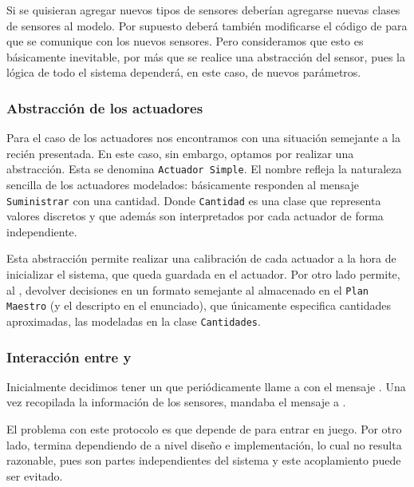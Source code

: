           Si se quisieran agregar nuevos tipos de sensores deber\'ian agregarse nuevas
          clases de sensores al modelo. Por supuesto deber\'a tambi\'en modificarse
          el c\'odigo de \condiciones{} para que se comunique
          con los nuevos sensores. Pero consideramos que esto es b\'asicamente inevitable,
          por m\'as que se realice una abstracci\'on del sensor, pues la l\'ogica
          de todo el sistema depender\'a, en este caso, de nuevos par\'ametros.

          \subsubsection{Abstracci\'on de los actuadores}
          Para el caso de los actuadores nos encontramos con una situaci\'on semejante
          a la reci\'en presentada. En este caso, sin embargo, optamos por realizar
          una abstracci\'on. Esta se denomina \texttt{Actuador Simple}. El nombre
          refleja la naturaleza sencilla de los actuadores modelados: b\'asicamente
          responden al mensaje \texttt{Suministrar} con una cantidad. Donde
          \texttt{Cantidad} es una clase que representa valores discretos y que adem\'as
          son interpretados por cada actuador de forma independiente.

          Esta abstracci\'on permite realizar una calibraci\'on de cada actuador a la
          hora de inicializar el sistema, que queda
          guardada en el actuador. Por otro lado permite, al \decisiones{},
          devolver decisiones en un formato semejante al almacenado en el
          \texttt{Plan Maestro} (y el descripto en el enunciado), que \'unicamente
          especifica cantidades aproximadas, las modeladas en la clase
          \texttt{Cantidades}.

      \subsubsection{Interacci\'on entre \decisiones{} y \condiciones{}}
          Inicialmente decidimos tener un \timer{} que peri\'odicamente llame a \condiciones{}
          con el mensaje \sensarCondiciones{}. Una vez recopilada la informaci\'on de los
          sensores, \condiciones{} mandaba el mensaje \tomarDecisiones{} a \decisiones{}.

          El problema con este protocolo es que \decisiones{} depende de \condiciones{}
          para entrar en juego. Por otro lado, \condiciones{} termina dependiendo de
          \condiciones{} a nivel dise\~no e implementaci\'on, lo cual no resulta razonable,
          pues son partes independientes del sistema y este acoplamiento puede ser evitado.

